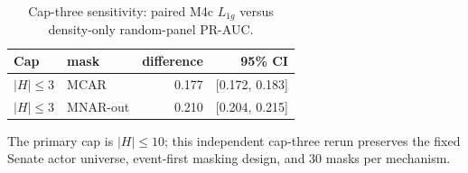 \begin{table}[tbp]
\centering
\small
\caption{Cap-three sensitivity: paired M4c $L_{1g}$ versus density-only random-panel PR-AUC.}
\label{tab:senate-cap-sensitivity}
\begin{tabular}{llrr}
\toprule
Cap & mask & difference & 95\% CI \\
\midrule
$|H|\leq3$ & MCAR & 0.177 & [0.172, 0.183] \\
$|H|\leq3$ & MNAR-out & 0.210 & [0.204, 0.215] \\
\bottomrule
\end{tabular}
\par\vspace{2pt}\footnotesize The primary cap is $|H|\leq10$; this independent cap-three rerun preserves the fixed Senate actor universe, event-first masking design, and 30 masks per mechanism.
\end{table}
